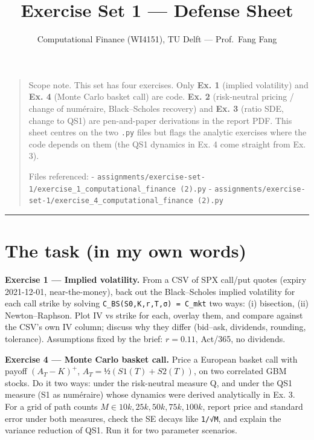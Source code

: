 \documentclass[
  11pt,
]{article}
\title{Exercise Set 1 --- Defense Sheet}
\author{Computational Finance (WI4151), TU Delft --- Prof.~Fang Fang}
\date{}
\begin{document}
\maketitle

{
\hypersetup{linkcolor=blue}
\setcounter{tocdepth}{3}
\tableofcontents
}
\begin{quote}
Scope note. This set has four exercises. Only \textbf{Ex. 1} (implied
volatility) and \textbf{Ex. 4} (Monte Carlo basket call) are code.
\textbf{Ex. 2} (risk-neutral pricing / change of numéraire,
Black--Scholes recovery) and \textbf{Ex. 3} (ratio SDE, change to QS1)
are pen-and-paper derivations in the report PDF. This sheet centres on
the two \texttt{.py} files but flags the analytic exercises where the
code depends on them (the QS1 dynamics in Ex. 4 come straight from Ex.
3).

Files referenced: -
\texttt{assignments/exercise-set-1/exercise\_1\_computational\_finance\ (2).py}
-
\texttt{assignments/exercise-set-1/exercise\_4\_computational\_finance\ (2).py}
\end{quote}

\begin{center}\rule{0.5\linewidth}{0.5pt}\end{center}

\hypertarget{the-task-in-my-own-words}{%
\section{The task (in my own words)}\label{the-task-in-my-own-words}}

\textbf{Exercise 1 --- Implied volatility.} From a CSV of SPX call/put
quotes (expiry 2021-12-01, near-the-money), back out the Black--Scholes
implied volatility for each call strike by solving
\texttt{C\_BS(S0,K,r,T,σ)\ =\ C\_mkt} two ways: (i) bisection, (ii)
Newton--Raphson. Plot IV vs strike for each, overlay them, and compare
against the CSV's own IV column; discuss why they differ (bid--ask,
dividends, rounding, tolerance). Assumptions fixed by the brief:
\(r = 0.11%
\), Act/365, no dividends.

\textbf{Exercise 4 --- Monte Carlo basket call.} Price a European basket
call with payoff \((A_T − K)^+\), \(A_T = ½(S1(T)+S2(T))\), on two
correlated GBM stocks. Do it two ways: under the risk-neutral measure Q,
and under the QS1 measure (S1 as numéraire) whose dynamics were derived
analytically in Ex. 3. For a grid of path counts
\(M ∈ {10k,25k,50k,75k,100k}\), report price and standard error under
both measures, check the SE decays like \texttt{1/√M}, and explain the
variance reduction of QS1. Run it for two parameter scenarios.
\end{document}
